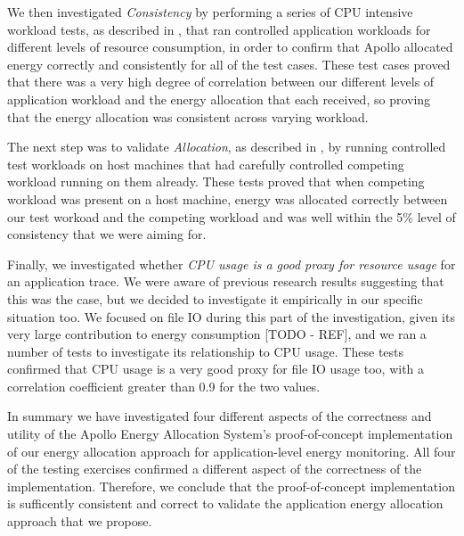 We then investigated \textit{Consistency} by performing a series of CPU intensive workload tests, as described in , that ran controlled application workloads for different levels of resource consumption, in order to confirm that Apollo allocated energy correctly and consistently for all of the test cases.  These test cases proved that there was a very high degree of correlation between our different levels of application workload and the energy allocation that each received, so proving that the energy allocation was consistent across varying workload.

The next step was to validate \textit{Allocation}, as described in , by running controlled test workloads on host machines that had carefully controlled competing workload running on them already. These tests proved that when competing workload was present on a host machine, energy was allocated correctly between our test workoad and the competing workload and was well within the 5\% level of consistency that we were aiming for.

Finally, we investigated whether \textit{CPU usage is a good proxy for resource usage} for an application trace.  We were aware of previous research results suggesting that this was the case, but we decided to investigate it empirically in our specific situation too.  We focused on file IO during this part of the investigation, given its very large contribution to energy consumption [TODO - REF], and we ran a number of tests to investigate its relationship to CPU usage.  These tests confirmed that CPU usage is a very good proxy for file IO usage too, with a correlation coefficient greater than 0.9 for the two values.

In summary we have investigated four different aspects of the correctness and utility of the Apollo Energy Allocation System's proof-of-concept implementation of our energy allocation approach for application-level energy monitoring.  All four of the testing exercises confirmed a different aspect of the correctness of the implementation.  Therefore, we conclude that the proof-of-concept implementation is sufficently consistent and correct to validate the application energy allocation approach that we propose.

